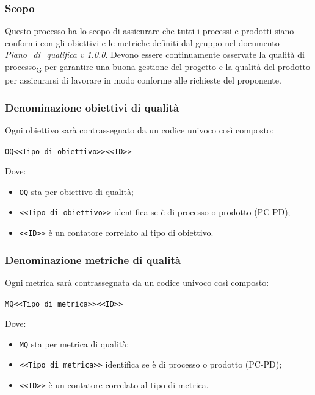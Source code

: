 \subsubsection{Scopo}
Questo processo ha lo scopo di assicurare che tutti i processi e prodotti siano conformi con gli obiettivi e le metriche definiti dal gruppo nel documento \textit{Piano\_di\_qualifica v 1.0.0}. 
Devono essere continuamente osservate la qualità di processo\textsubscript{G} per garantire una buona gestione del progetto e la qualità del prodotto per assicurarsi di lavorare in modo conforme alle richieste del proponente.
\subsubsection{Denominazione obiettivi di qualità}
Ogni obiettivo sarà contrassegnato da un codice univoco così composto:
\begin{center}
	\verb|OQ<<Tipo di obiettivo>><<ID>>|
\end{center}
Dove:
\begin{itemize}
	\item \verb|OQ| sta per obiettivo di qualità;
	\item \verb|<<Tipo di obiettivo>>| identifica se è di processo o prodotto (PC-PD);
	\item \verb|<<ID>>| è un contatore correlato al tipo di obiettivo.
\end{itemize}
\subsubsection{Denominazione metriche di qualità}
Ogni metrica sarà contrassegnata da un codice univoco così composto:
\begin{center}
	\verb|MQ<<Tipo di metrica>><<ID>>|
\end{center}
Dove:
\begin{itemize}
	\item \verb|MQ| sta per metrica di qualità;
	\item \verb|<<Tipo di metrica>>| identifica se è di processo o prodotto (PC-PD);
	\item \verb|<<ID>>| è un contatore correlato al tipo di metrica.
\end{itemize}
